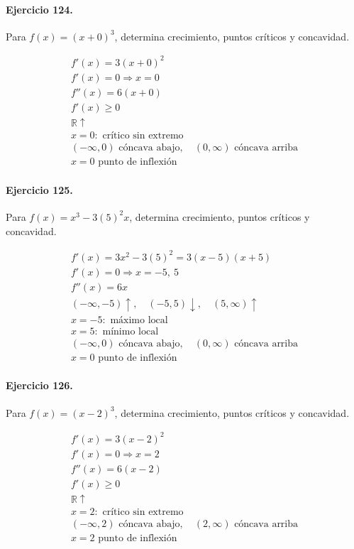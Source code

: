 \documentclass[11pt,a4paper]{article}
\begin{document}
\paragraph{Ejercicio 124.} Para $f(x)=(x+0)^3$, determina crecimiento, puntos críticos y concavidad.

\[
\begin{aligned}
f'(x)=3(x+0)^2\\
f'(x)=0\Rightarrow x=0\\
f''(x)=6(x+0)\\
f'(x)\ge0\\
\mathbb{R}\uparrow\\
x=0:\text{ crítico sin extremo}\\
(-\infty,0)\text{ cóncava abajo},\quad(0,\infty)\text{ cóncava arriba}\\
x=0\text{ punto de inflexión}
\end{aligned}
\]


\paragraph{Ejercicio 125.} Para $f(x)=x^3-3(5)^2x$, determina crecimiento, puntos críticos y concavidad.

\[
\begin{aligned}
f'(x)=3x^2-3(5)^2=3(x-5)(x+5)\\
f'(x)=0\Rightarrow x=-5,\ 5\\
f''(x)=6x\\
(-\infty,-5)\uparrow,\quad(-5,5)\downarrow,\quad(5,\infty)\uparrow\\
x=-5:\text{ máximo local}\\
x=5:\text{ mínimo local}\\
(-\infty,0)\text{{ cóncava abajo}},\quad(0,\infty)\text{{ cóncava arriba}}\\
x=0\text{{ punto de inflexión}}
\end{aligned}
\]


\paragraph{Ejercicio 126.} Para $f(x)=(x-2)^3$, determina crecimiento, puntos críticos y concavidad.

\[
\begin{aligned}
f'(x)=3(x-2)^2\\
f'(x)=0\Rightarrow x=2\\
f''(x)=6(x-2)\\
f'(x)\ge0\\
\mathbb{R}\uparrow\\
x=2:\text{ crítico sin extremo}\\
(-\infty,2)\text{ cóncava abajo},\quad(2,\infty)\text{ cóncava arriba}\\
x=2\text{ punto de inflexión}
\end{aligned}
\]
\end{document}

